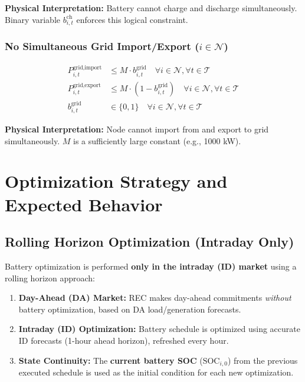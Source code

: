 \documentclass[11pt,a4paper]{article}
\begin{document}
\textbf{Physical Interpretation:} Battery cannot charge and discharge simultaneously. Binary variable $b_{i,t}^{\text{ch}}$ enforces this logical constraint.

\subsubsection{No Simultaneous Grid Import/Export ($i \in \mathcal{N}$)}

\begin{align}
P_{i,t}^{\text{grid,import}} &\leq M \cdot b_{i,t}^{\text{grid}} \quad \forall i \in \mathcal{N}, \forall t \in \mathcal{T} \\
P_{i,t}^{\text{grid,export}} &\leq M \cdot (1 - b_{i,t}^{\text{grid}}) \quad \forall i \in \mathcal{N}, \forall t \in \mathcal{T} \\
b_{i,t}^{\text{grid}} &\in \{0, 1\} \quad \forall i \in \mathcal{N}, \forall t \in \mathcal{T}
\end{align}

\textbf{Physical Interpretation:} Node cannot import from and export to grid simultaneously. $M$ is a sufficiently large constant (e.g., 1000 kW).

\section{Optimization Strategy and Expected Behavior}

\subsection{Rolling Horizon Optimization (Intraday Only)}

Battery optimization is performed \textbf{only in the intraday (ID) market} using a rolling horizon approach:

\begin{enumerate}
    \item \textbf{Day-Ahead (DA) Market:} REC makes day-ahead commitments \textit{without} battery optimization, based on DA load/generation forecasts.
    \item \textbf{Intraday (ID) Optimization:} Battery schedule is optimized using accurate ID forecasts (1-hour ahead horizon), refreshed every hour.
    \item \textbf{State Continuity:} The \textbf{current battery SOC} ($\text{SOC}_{i,0}$) from the previous executed schedule is used as the initial condition for each new optimization.
\end{enumerate}
\end{document}

